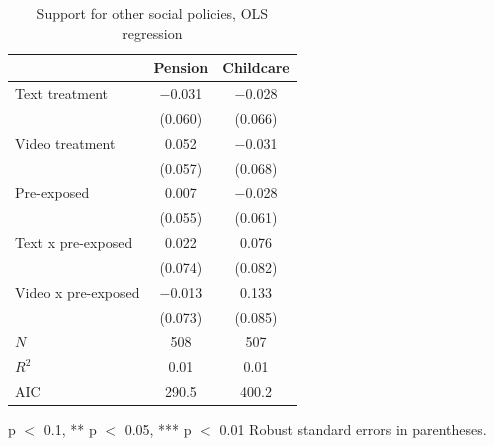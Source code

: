 \documentclass[
  11pt,
  oneside]{article}
\begin{document}
\begin{table}[H]
\centering\centering
\caption{\label{tab:fig-ui}Support for other social policies, OLS regression  \label{tab:tab-placebo}}
\centering
\begin{threeparttable}
\begin{tabular}[t]{lcc}
\toprule
  & Pension & Childcare\\
\midrule
Text treatment & \num{-0.031} & \num{-0.028}\\
 & (\num{0.060}) & (\num{0.066})\\
Video treatment & \num{0.052} & \num{-0.031}\\
 & (\num{0.057}) & (\num{0.068})\\
Pre-exposed & \num{0.007} & \num{-0.028}\\
 & (\num{0.055}) & (\num{0.061})\\
Text x pre-exposed & \num{0.022} & \num{0.076}\\
 & (\num{0.074}) & (\num{0.082})\\
Video x pre-exposed & \num{-0.013} & \num{0.133}\\
 & (\num{0.073}) & (\num{0.085})\\
\midrule
$N$ & \num{508} & \num{507}\\
$R^2$ & \num{0.01} & \num{0.01}\\
AIC & \num{290.5} & \num{400.2}\\
\bottomrule
\end{tabular}
\begin{tablenotes}
\item * p $<$ 0.1, ** p $<$ 0.05, *** p $<$ 0.01 Robust standard errors in parentheses.
\end{tablenotes}
\end{threeparttable}
\end{table}
\end{document}
